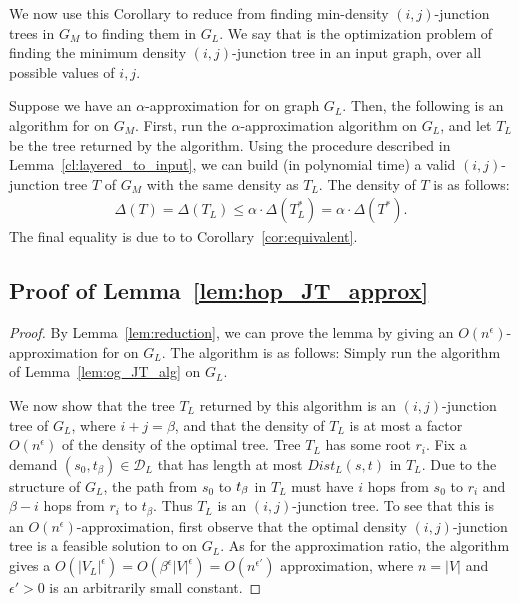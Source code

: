 We now use this Corollary to reduce from finding min-density $(i,j)$-junction trees in $G_M$ to finding them in $G_L$. We say that {\jt} is the optimization problem of finding the minimum density $(i,j)$-junction tree in an input graph, over all possible values of $i,j$.

Suppose we have an $\alpha$-approximation for {\jt} on graph $G_L$. Then, the following is an algorithm for {\jt} on $G_M$. First, run the $\alpha$-approximation algorithm on $G_L$, and let $T_L$ be the tree returned by the algorithm. Using the procedure described in Lemma~\ref{cl:layered_to_input}, we can build (in polynomial time) a valid $(i,j)$-junction tree $T$ of $G_M$ with the same density as $T_L$. The density of $T$ is as follows:
    \begin{align*}
        \Delta(T) = \Delta(T_L) \leq \alpha \cdot \Delta(T_L^*) = \alpha \cdot \Delta(T^*).
    \end{align*}
    The final equality is due to to Corollary~\ref{cor:equivalent}.

\subsection{Proof of Lemma~\ref{lem:hop_JT_approx}} \label{app:jt_alg}

\begin{proof}
    By Lemma~\ref{lem:reduction}, we can prove the lemma by giving an $O(n^\epsilon)$-approximation for {\jt} on $G_L$. The algorithm is as follows: Simply run the algorithm of Lemma~\ref{lem:og_JT_alg} on $G_L$.

    We now show that the tree $T_L$ returned by this algorithm is an $(i,j)$-junction tree of $G_L$, where $i+j = \beta$, and that the density of $T_L$ is at most a factor $O(n^\epsilon)$ of the density of the optimal tree.
    Tree $T_L$ has some root $r_i$. 
    Fix a demand $(s_0,t_\beta) \in \mathcal{D}_L$ that has length at most $Dist_L(s,t)$ in $T_L$. Due to the structure of $G_L$, the path from $s_0$ to $t_\beta$ in $T_L$ must have $i$ hops from $s_0$ to $r_i$ and $\beta - i$ hops from $r_i$ to $t_\beta$. Thus $T_L$ is an $(i,j)$-junction tree. To see that this is an $O(n^\epsilon)$-approximation, first observe that the optimal density $(i,j)$-junction tree is a feasible solution to {\ljt} on $G_L$. As for the approximation ratio, the algorithm gives a $O(|V_L|^\epsilon) = O(\beta^\epsilon |V|^\epsilon) = O(n^{\epsilon'})$ approximation, where $n = |V|$ and $\epsilon' > 0$ is an arbitrarily small constant.
\end{proof}





